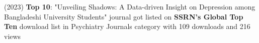 (2023) \textbf{Top 10}{: "Unveiling Shadows: A Data-driven Insight on Depression among Bangladeshi University Students" journal got listed on \textbf{SSRN's Global Top Ten} download list in Psychiatry Journals category with 109 downloads and 216 views} \\